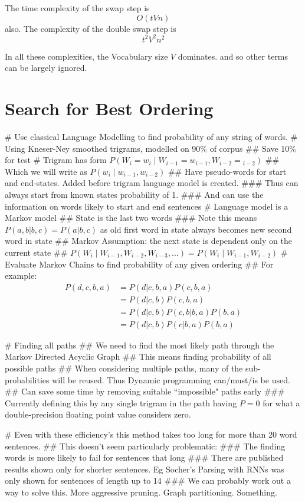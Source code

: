 \documentclass[]{scrartcl}
\begin{document}
The time complexity of the swap step is $$O(tVn)$$ also.
The complexity of the double swap step is $$t^2 V^2 n^2$$

In all these complexities, the Vocabulary size $V$ dominates. and so other terms can be largely ignored.

\section{Search for Best Ordering}
\begin{easylist}[itemize]
	# Use classical Language Modelling to find probability of any string of words.
	# Using Kneser-Ney smoothed trigrams, modelled on 90\% of corpus
	## Save 10\% for test
	# Trigram has form $P(W_i\!=\!w_i \mid W_{i-1}\!=\!w_{i-1}, W_{i-2}\!=\!_{i-2})$
	## Which we will write as $P(w_i \mid w_{i-1}, w_{i-2})$
	## Have pseudo-words for start and end-states. Added before trigram language model is created.
	### Thus can always start from known states probability of 1.
	### And can use the information on words likely to start and end sentences
	# Language model is a Markov model
	## State is the last two words
	### Note this means $P(a,b|b,c)=P(a|b,c)$ as old first word in state always becomes new second word in state
	## Markov Assumption: the next state is dependent only on the current state
	##  $P(W_i \mid W_{i-1}, W_{i-2}, W_{i-3}, ...) = P(W_i \mid W_{i-1}, W_{i-2})$
	# Evaluate Markov Chains to find probability of any given ordering
	## For example:
	\begin{equation}
	\begin{split}
	P(d,c,b,a) &= P(d|c,b,a) P(c,b,a) \\
			   &= P(d|c,b) P(c,b,a) \\
			   &= P(d|c,b) P(c,b|b,a) P(b,a) \\
			   &=P(d|c,b) P(c|b,a) P(b,a)
	\end{split}
	\end{equation}
	
	# Finding all paths
	## We need to find the most likely path through the Markov Directed Acyclic Graph
	## This means finding probability of all possible paths
	## When considering multiple paths, many of the sub-probabilities will be reused. Thus Dynamic programming can/must/is be used.
	## Can save some time by removing suitable ``impossible" paths early
	### Currently defining this by any single trigram in the path having $P=0$ for what a double-precision floating point value considers zero.
	
	# Even with these efficiency's this method takes too long for more than 20 word sentences. 
	## This doesn't seem particularly problematic:
	### The finding words is more likely to fail for sentences that long
	### There are published results shown only for shorter sentences. Eg Socher's Parsing with RNNs was only shown for sentences of length up to 14
	### We can probably work out a way to solve this. More aggressive pruning. Graph partitioning. Something.

	
\end{easylist}
\end{document}
